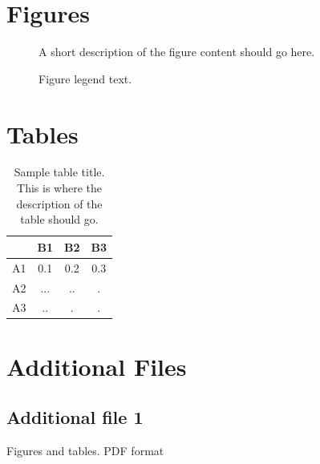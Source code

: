\documentclass{bmcart}
\begin{document}
\begin{backmatter}

\section*{Figures}
  \begin{figure}[h!]
  \caption{
      A short description of the figure content
      should go here.}
      \end{figure}

\begin{figure}[h!]
  \caption{
      Figure legend text.}
      \end{figure}


\section*{Tables}
\begin{table}[h!]
\caption{Sample table title. This is where the description of the table should go.}
      \begin{tabular}{cccc}
        \hline
           & B1  &B2   & B3\\ \hline
        A1 & 0.1 & 0.2 & 0.3\\
        A2 & ... & ..  & .\\
        A3 & ..  & .   & .\\ \hline
      \end{tabular}
\end{table}


\section*{Additional Files}
  \subsection*{Additional file 1} \label{add:figs_tbls}
    Figures and tables. PDF format


\end{backmatter}
\end{document}

